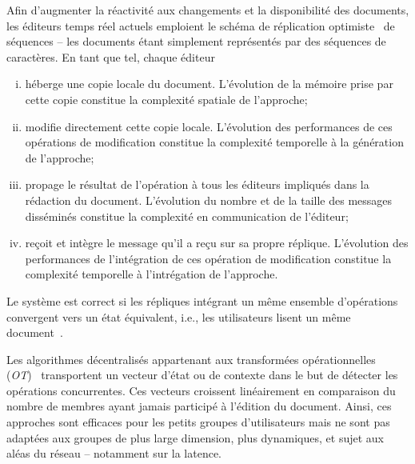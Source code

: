 Afin d'augmenter la réactivité aux changements et la disponibilité des
documents, les éditeurs temps réel actuels emploient le schéma de réplication
optimiste~\cite{demers1987epidemic, ladin1992providing, saito2005optimistic,
sun1998achieving} de séquences -- les documents étant simplement représentés par
des séquences de caractères. En tant que tel, chaque éditeur
\begin{enumerate}[(i)] 
\item héberge une copie locale du document. L'évolution de la mémoire prise par
cette copie constitue la complexité spatiale de l'approche;

\item modifie directement cette copie locale. L'évolution des performances de
ces opérations de modification constitue la complexité temporelle à la
génération de l'approche;

\item propage le résultat de l'opération à tous les éditeurs impliqués dans la
rédaction du document. L'évolution du nombre et de la taille des messages
disséminés constitue la complexité en communication de l'éditeur;

\item reçoit et intègre le message qu'il a reçu sur sa propre
réplique. L'évolution des performances de l'intégration de ces opération de
modification constitue la complexité temporelle à l'intrégation de l'approche.
\end{enumerate}


\noindent Le système est correct si les répliques intégrant un même ensemble
d'opérations convergent vers un état équivalent, i.e., les utilisateurs lisent
un même document~\cite{bailis2013eventual, shapiro2011conflict}.

Les algorithmes décentralisés appartenant aux transformées opérationnelles
(\emph{OT})~\cite{sun1998operational, sun2009contextbased} transportent un
vecteur d'état ou de contexte dans le but de détecter les opérations
concurrentes. Ces vecteurs croissent linéairement en comparaison du nombre de
membres ayant jamais participé à l'édition du document. Ainsi, ces approches
sont efficaces pour les petits groupes d'utilisateurs mais ne sont pas adaptées
aux groupes de plus large dimension, plus dynamiques, et sujet aux aléas du
réseau -- notamment sur la latence.

